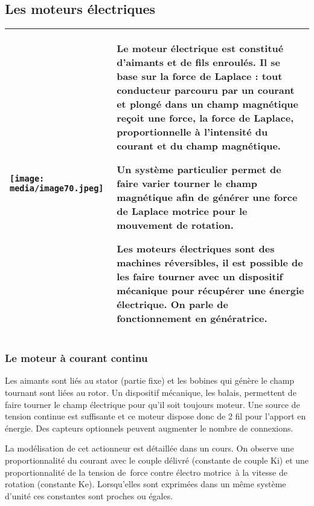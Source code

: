 \documentclass[
]{article}
\begin{document}
\hypertarget{les-moteurs-uxe9lectriques}{%
\subsection{Les moteurs électriques}\label{les-moteurs-uxe9lectriques}}

\begin{longtable}[]{@{}
  >{\raggedright\arraybackslash}p{}
  >{\raggedright\arraybackslash}p{}@{}}
\toprule
\endhead
\texttt{[image: media/image70.jpeg]} &
Le moteur électrique est constitué d'aimants et de fils enroulés. Il se
base sur la force de Laplace : tout conducteur parcouru par un courant
et plongé dans un champ magnétique reçoit une force, la force de
Laplace, proportionnelle à l'intensité du courant et du champ
magnétique.

Un système particulier permet de faire varier tourner le champ
magnétique afin de générer une force de Laplace motrice pour le
mouvement de rotation.

Les moteurs électriques sont des machines réversibles, il est possible
de les faire tourner avec un dispositif mécanique pour récupérer une
énergie électrique. On parle de fonctionnement en génératrice. \\
\bottomrule
\end{longtable}

\hypertarget{le-moteur-uxe0-courant-continu}{%
\subsubsection{Le moteur à courant
continu}\label{le-moteur-uxe0-courant-continu}}

Les aimants sont liés au stator (partie fixe) et les bobines qui génère
le champ tournant sont liées au rotor. Un dispositif mécanique, les
balais, permettent de faire tourner le champ électrique pour qu'il soit
toujours moteur. Une source de tension continue est suffisante et ce
moteur dispose donc de 2 fil pour l'apport en énergie. Des capteurs
optionnels peuvent augmenter le nombre de connexions.

La modélisation de cet actionneur est détaillée dans un cours. On
observe une proportionnalité du courant avec le couple délivré
(constante de couple Ki) et une proportionnalité de la tension de~force
contre électro motrice~à la vitesse de rotation (constante Ke).
Lorsqu'elles sont exprimées dans un même système d'unité ces constantes
sont proches ou égales.
\end{document}
